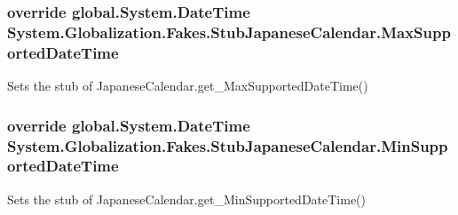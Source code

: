 \hypertarget{class_system_1_1_globalization_1_1_fakes_1_1_stub_japanese_calendar_a4da4aa0f20a0aa3e8c90630f6fb8dca2}{
\subsubsection[{Max\-Supported\-Date\-Time}]{\setlength{\rightskip}{0pt plus 5cm}override global.\-System.\-Date\-Time System.\-Globalization.\-Fakes.\-Stub\-Japanese\-Calendar.\-Max\-Supported\-Date\-Time\hspace{0.3cm}{\ttfamily [get]}}}\label{class_system_1_1_globalization_1_1_fakes_1_1_stub_japanese_calendar_a4da4aa0f20a0aa3e8c90630f6fb8dca2}


Sets the stub of Japanese\-Calendar.\-get\-\_\-\-Max\-Supported\-Date\-Time()

\hypertarget{class_system_1_1_globalization_1_1_fakes_1_1_stub_japanese_calendar_aac170f4e845be42bfbecc4bae6f584e4}{
\subsubsection[{Min\-Supported\-Date\-Time}]{\setlength{\rightskip}{0pt plus 5cm}override global.\-System.\-Date\-Time System.\-Globalization.\-Fakes.\-Stub\-Japanese\-Calendar.\-Min\-Supported\-Date\-Time\hspace{0.3cm}{\ttfamily [get]}}}\label{class_system_1_1_globalization_1_1_fakes_1_1_stub_japanese_calendar_aac170f4e845be42bfbecc4bae6f584e4}


Sets the stub of Japanese\-Calendar.\-get\-\_\-\-Min\-Supported\-Date\-Time()

